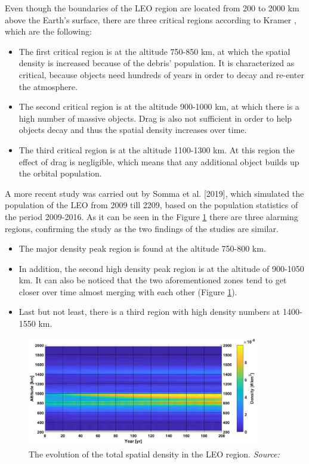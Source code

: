 Even though the boundaries of the LEO region are located from 200 to 2000 km above the Earth's surface, there are three critical regions according to Kramer \cite{Kramer 2002}, which are the following:
\begin{itemize}
\item The first critical region is at the altitude 750-850 km, at which the spatial density is increased because of the debris' population. It is characterized as critical, because objects need hundreds of years in order to decay and re-enter the atmosphere.
\item The second critical region is at the altitude 900-1000 km, at which there is a high number of massive objects. Drag is also not sufficient in order to help objects decay and thus the spatial density increases over time.
\item The third critical region is at the altitude 1100-1300 km. At this region the effect of drag is negligible, which means that any additional object builds up the orbital population.
\end{itemize}

A more recent study was carried out by Somma et al. [2019], which simulated the population of the LEO from 2009 till 2209, based on the population statistics of the period 2009-2016. As it can be seen in the Figure \ref{Somma} there are three alarming regions, confirming the \cite{Kramer 2002} study as the two findings of the studies are similar.
\begin{itemize}
\item The major density peak region is found at the altitude 750-800 km.
\item In addition, the second high density peak region is at the altitude of 900-1050 km. It can also be noticed that the two aforementioned zones tend to get closer over time almost merging with each other (Figure \ref{Somma}).
\item Last but not least, there is a third region with high density numbers at 1400-1550 km.
\end{itemize} 

\begin{figure}
\centering
\includegraphics[width=0.9\textwidth]{Images/Somma.png}\caption{The evolution of the total spatial density in the LEO region. \textit{Source: \cite{Somma 2019}}}
\label{Somma} 
\end{figure}

